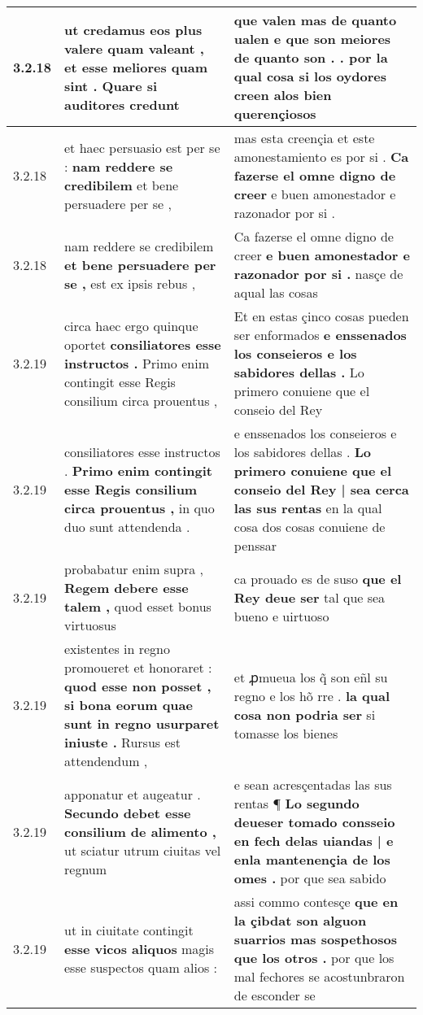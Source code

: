 \begin{tabular}{|p{1cm}|p{6.5cm}|p{6.5cm}|}
3.2.18 & ut credamus eos plus valere quam valeant , \textbf{ et esse meliores quam sint . } Quare si auditores credunt & que valen mas de quanto ualen \textbf{ e que son meiores de quanto son . . } por la qual cosa si los oydores creen alos bien querençiosos \\\hline
3.2.18 & et haec persuasio est per se : \textbf{ nam reddere se credibilem } et bene persuadere per se , & mas esta creençia et este amonestamiento es por si . \textbf{ Ca fazerse el omne digno de creer } e buen amonestador e razonador por si . \\\hline
3.2.18 & nam reddere se credibilem \textbf{ et bene persuadere per se , } est ex ipsis rebus , & Ca fazerse el omne digno de creer \textbf{ e buen amonestador e razonador por si . } nasçe de aqual las cosas \\\hline
3.2.19 & circa haec ergo quinque oportet \textbf{ consiliatores esse instructos . } Primo enim contingit esse Regis consilium circa prouentus , & Et en estas çinco cosas pueden ser enformados \textbf{ e enssenados los conseieros e los sabidores dellas . } Lo primero conuiene que el conseio del Rey \\\hline
3.2.19 & consiliatores esse instructos . \textbf{ Primo enim contingit esse Regis consilium circa prouentus , } in quo duo sunt attendenda . & e enssenados los conseieros e los sabidores dellas . \textbf{ Lo primero conuiene que el conseio del Rey | sea cerca las sus rentas } en la qual cosa dos cosas conuiene de penssar \\\hline
3.2.19 & probabatur enim supra , \textbf{ Regem debere esse talem , } quod esset bonus virtuosus & ca prouado es de suso \textbf{ que el Rey deue ser } tal que sea bueno e uirtuoso \\\hline
3.2.19 & existentes in regno promoueret et honoraret : \textbf{ quod esse non posset , si bona eorum quae sunt in regno usurparet iniuste . } Rursus est attendendum , & et ꝓmueua los q̃ son eñl su regno e los hõ rre . \textbf{ la qual cosa non podria ser } si tomasse los bienes \\\hline
3.2.19 & apponatur et augeatur . \textbf{ Secundo debet esse consilium de alimento , } ut sciatur utrum ciuitas vel regnum & e sean acresçentadas las sus rentas ¶ \textbf{ Lo segundo deueser tomado consseio en fech delas uiandas | e enla mantenençia de los omes . } por que sea sabido \\\hline
3.2.19 & ut in ciuitate contingit \textbf{ esse vicos aliquos } magis esse suspectos quam alios : & assi commo contesçe \textbf{ que en la çibdat son alguon suarrios mas sospethosos que los otros . } por que los mal fechores se acostunbraron de esconder se \\\hline

\end{tabular}

